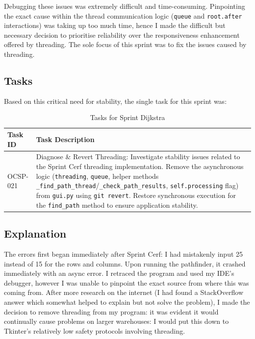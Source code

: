 Debugging these issues was extremely difficult and time-consuming. Pinpointing the exact cause within the thread communication logic (\verb|queue| and \verb|root.after| interactions) was taking up too much time, hence I made the difficult but necessary decision to prioritise reliability over the responsiveness enhancement offered by threading. The sole focus of this sprint was to fix the issues caused by threading.

\subsection{Tasks}

Based on this critical need for stability, the single task for this sprint was:
\begin{table}[htbp]
	\centering
	\begin{tabularx}{\textwidth}{|l|X|}
		\hline
		\textbf{Task ID} & \textbf{Task Description} \\
		\hline
		OCSP-021 & Diagnose \& Revert Threading: Investigate stability issues related to the Sprint Cerf threading implementation. Remove the asynchronous logic (\verb|threading|, \verb|queue|, helper methods \verb|_find_path_thread|/\verb|_check_path_results|, \verb|self.processing| flag) from \verb|gui.py| using \verb|git revert|. Restore synchronous execution for the \verb|find_path| method to ensure application stability. \\
		\hline
	\end{tabularx}
	\caption{Tasks for Sprint Dijkstra}
\end{table}

\subsection{Explanation}

The errors first began immediately after Sprint Cerf: I had mistakenly input 25 instead of 15 for the rows and columns. Upon running the pathfinder, it crashed immediately with an async error. I retraced the program and used my IDE's debugger, however I was unable to pinpoint the exact source from where this was coming from. After more research on the internet (I had found a StackOverflow answer which somewhat helped to explain but not solve the problem), I made the decision to remove threading from my program: it was evident it would continually cause problems on larger warehouses: I would put this down to Tkinter's relatively low safety protocols involving threading.


